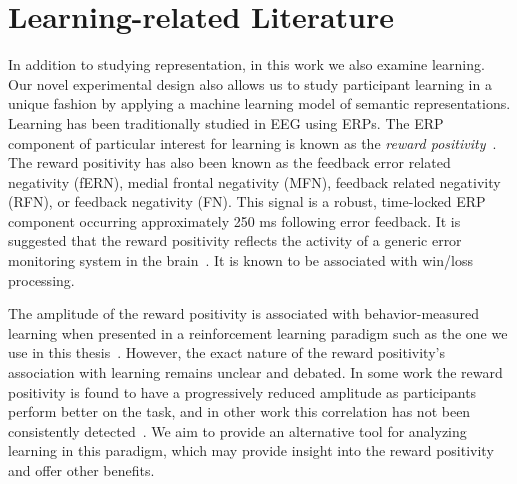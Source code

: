 \section{Learning-related Literature}

In addition to studying representation, in this work we also examine learning. 
Our novel experimental design also allows us to study participant learning in a 
unique fashion by applying a machine learning model of semantic 
representations.  Learning has been traditionally studied in EEG using ERPs.  
The ERP component of particular interest for learning is known as the 
\emph{reward positivity}~\cite{proudfit2015reward}. The reward positivity has 
also been known as the feedback error related negativity (fERN), medial frontal 
negativity (MFN), feedback related negativity (RFN), or feedback negativity 
(FN). This signal is a robust, time-locked ERP component occurring 
approximately 250 ms following error feedback. It is suggested that the reward 
positivity reflects the activity of a generic error monitoring system in the 
brain~\cite{miltner1997event}. It is known to be associated with win/loss 
processing.

The amplitude of the reward positivity is associated with behavior-measured 
learning when presented in a reinforcement learning paradigm such as the one we 
use in this thesis~\cite{holroyd2002neural, sutton1998reinforcement, 
williams2017application}. However, the exact nature of the reward positivity's 
association with learning remains unclear and debated. In some work the reward 
positivity is found to have a progressively reduced amplitude as participants 
perform better on the task, and in other work this correlation has not been 
consistently detected~\cite{walsh2012learning}. We aim to provide an 
alternative tool for analyzing learning in this paradigm, which may provide 
insight into the reward positivity and offer other benefits.
